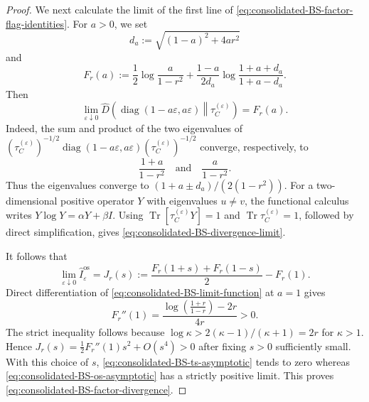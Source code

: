 \documentclass[11pt]{article}
\theoremstyle{remark}
\DeclareMathOperator{\os}{os}
\newcommand{\1}{\mathbbm{1}}
\begin{document}
\begin{proof}
We next calculate the limit of the first line of
\eqref{eq:consolidated-BS-factor-flag-identities}.  For $a>0$, we set
\begin{equation}
 d_a:=\sqrt{(1-a)^2+4ar^2}
\end{equation}
and
\begin{equation}
 F_r(a):=\frac12\log\frac{a}{1-r^2}
 +\frac{1-a}{2d_a}
  \log\frac{1+a+d_a}{1+a-d_a}.
 \label{eq:consolidated-BS-limit-function}
\end{equation}
Then
\begin{equation}
 \lim_{\varepsilon\downarrow0}
 \widehat D\!\left(
  \operatorname{diag}(1-a\varepsilon,a\varepsilon)
  \middle\Vert\tau_C^{(\varepsilon)}\right)=F_r(a).
 \label{eq:consolidated-BS-divergence-limit}
\end{equation}
Indeed, the sum and product of the two eigenvalues of
$(\tau_C^{(\varepsilon)})^{-1/2}
 \operatorname{diag}(1-a\varepsilon,a\varepsilon)
 (\tau_C^{(\varepsilon)})^{-1/2}$ converge, respectively, to
\begin{equation}
 \frac{1+a}{1-r^2}
 \quad\text{and}\quad
 \frac{a}{1-r^2}.
\end{equation}
Thus the eigenvalues converge to
$(1+a\pm d_a)/(2(1-r^2))$.  For a two-dimensional positive
operator $Y$ with eigenvalues $u\neq v$, the functional calculus
writes $Y\log Y=\alpha Y+\beta I$.  Using
$\operatorname{Tr}[\tau_C^{(\varepsilon)}Y]=1$ and
$\operatorname{Tr}\tau_C^{(\varepsilon)}=1$, followed by direct simplification,
gives \eqref{eq:consolidated-BS-divergence-limit}.

It follows that
\begin{equation}
 \lim_{\varepsilon\downarrow0}\widehat I^{\os}_\varepsilon
 =J_r(s):=\frac{F_r(1+s)+F_r(1-s)}2-F_r(1).
 \label{eq:consolidated-BS-os-asymptotic}
\end{equation}
Direct differentiation of \eqref{eq:consolidated-BS-limit-function}
at $a=1$ gives
\begin{equation}
 F_r''(1)
 =\frac{\log\!\left(\frac{1+r}{1-r}\right)-2r}{4r}>0.
 \label{eq:consolidated-BS-limit-curvature}
\end{equation}
The strict inequality follows because
$\log\kappa>2(\kappa-1)/(\kappa+1)=2r$ for $\kappa>1$.
Hence $J_r(s)=\frac12F_r''(1)s^2+O(s^4)>0$ after fixing $s>0$
sufficiently small.  With this choice of $s$,
\eqref{eq:consolidated-BS-ts-asymptotic} tends to zero whereas
\eqref{eq:consolidated-BS-os-asymptotic} has a strictly positive
limit.  This proves \eqref{eq:consolidated-BS-factor-divergence}.
\end{proof}
\end{document}
